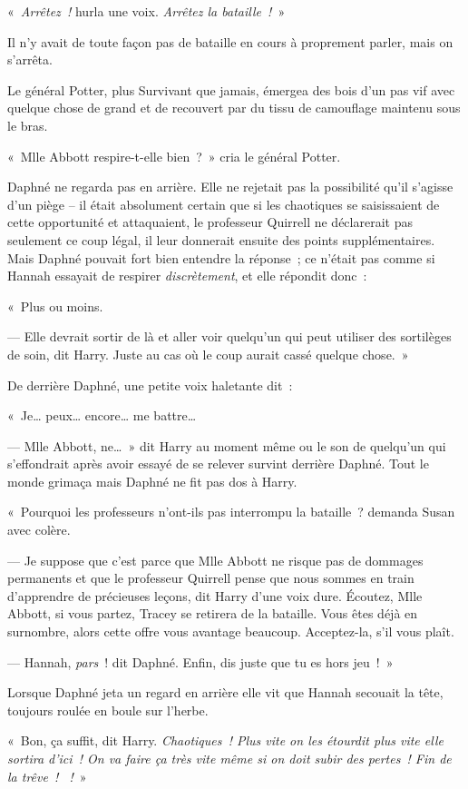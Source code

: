 «~\emph{Arrêtez~!} hurla une voix.
\emph{Arrêtez la bataille~!}~»

Il n'y avait de toute façon pas de bataille en cours à proprement parler, mais on s'arrêta.

Le général Potter, plus Survivant que jamais, émergea des bois d'un pas vif avec quelque chose de grand et de recouvert par du tissu de camouflage maintenu sous le bras.

«~Mlle Abbott respire-t-elle bien~?~»
cria le général Potter.

Daphné ne regarda pas en arrière.
Elle ne rejetait pas la possibilité qu'il s'agisse d'un piège -- il était absolument certain que si les chaotiques se saisissaient de cette opportunité et attaquaient, le professeur Quirrell ne déclarerait pas seulement ce coup légal, il leur donnerait ensuite des points supplémentaires.
Mais Daphné pouvait fort bien entendre la réponse~; ce n'était pas comme si Hannah essayait de respirer \emph{discrètement}, et elle répondit donc~:

«~Plus ou moins.

--- Elle devrait sortir de là et aller voir quelqu'un qui peut utiliser des sortilèges de soin, dit Harry.
Juste au cas où le coup aurait cassé quelque chose.~»

De derrière Daphné, une petite voix haletante dit~:

«~Je… peux… encore… me battre…

--- Mlle Abbott, ne…~»
dit Harry au moment même ou le son de quelqu'un qui s'effondrait après avoir essayé de se relever survint derrière Daphné.
Tout le monde grimaça mais Daphné ne fit pas dos à Harry.

«~Pourquoi les professeurs n'ont-ils pas interrompu la bataille~? demanda Susan avec colère.

--- Je suppose que c'est parce que Mlle Abbott ne risque pas de dommages permanents et que le professeur Quirrell pense que nous sommes en train d'apprendre de précieuses leçons, dit Harry d'une voix dure.
Écoutez, Mlle Abbott, si vous partez, Tracey se retirera de la bataille.
Vous êtes déjà en surnombre, alors cette offre vous avantage beaucoup.
Acceptez-la, s'il vous plaît.

--- Hannah, \emph{pars}~! dit Daphné.
Enfin, dis juste que tu es hors jeu~!~»

Lorsque Daphné jeta un regard en arrière elle vit que Hannah secouait la tête, toujours roulée en boule sur l'herbe.

«~Bon, ça suffit, dit Harry.
\emph{Chaotiques~!
Plus vite on les étourdit plus vite elle sortira d'ici~!
On va faire ça très vite même si on doit subir des pertes~!
Fin de la trêve~!
~!}~»

